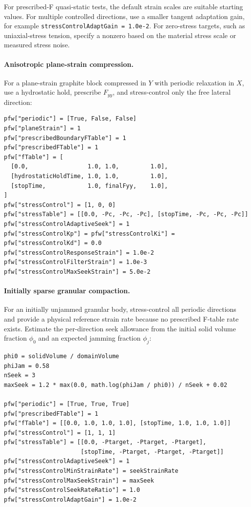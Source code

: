 For prescribed-F quasi-static tests, the default strain scales are suitable
starting values.  For multiple controlled directions, use a smaller tangent
adaptation gain, for example \texttt{stressControlAdaptGain = 1.0e-2}.  For
zero-stress targets, such as uniaxial-stress tension, specify a nonzero
 based on the material stress scale or measured
stress noise.

\paragraph{Anisotropic plane-strain compression.}
For a plane-strain graphite block compressed in $Y$ with periodic relaxation in
$X$, use a hydrostatic hold, prescribe $F_{yy}$, and stress-control only the
free lateral direction:
\begin{lstlisting}[caption={Plane-strain anisotropic compression with X pressure control.}]
pfw["periodic"] = [True, False, False]
pfw["planeStrain"] = 1
pfw["prescribedBoundaryFTable"] = 1
pfw["prescribedFTable"] = 1
pfw["fTable"] = [
  [0.0,                 1.0, 1.0,         1.0],
  [hydrostaticHoldTime, 1.0, 1.0,         1.0],
  [stopTime,            1.0, finalFyy,    1.0],
]
pfw["stressControl"] = [1, 0, 0]
pfw["stressTable"] = [[0.0, -Pc, -Pc, -Pc], [stopTime, -Pc, -Pc, -Pc]]
pfw["stressControlAdaptiveSeek"] = 1
pfw["stressControlKp"] = pfw["stressControlKi"] = pfw["stressControlKd"] = 0.0
pfw["stressControlResponseStrain"] = 1.0e-2
pfw["stressControlFilterStrain"] = 1.0e-3
pfw["stressControlMaxSeekStrain"] = 5.0e-2
\end{lstlisting}

\paragraph{Initially sparse granular compaction.}
For an initially unjammed granular body, stress-control all periodic directions
and provide a physical reference strain rate because no prescribed F-table rate
exists.  Estimate the per-direction seek allowance from the initial solid volume
fraction $\phi_0$ and an expected jamming fraction $\phi_j$:
\begin{lstlisting}[caption={Sparse granular compaction to hydrostatic pressure.}]
phi0 = solidVolume / domainVolume
phiJam = 0.58
nSeek = 3
maxSeek = 1.2 * max(0.0, math.log(phiJam / phi0)) / nSeek + 0.02

pfw["periodic"] = [True, True, True]
pfw["prescribedFTable"] = 1
pfw["fTable"] = [[0.0, 1.0, 1.0, 1.0], [stopTime, 1.0, 1.0, 1.0]]
pfw["stressControl"] = [1, 1, 1]
pfw["stressTable"] = [[0.0, -Ptarget, -Ptarget, -Ptarget],
                      [stopTime, -Ptarget, -Ptarget, -Ptarget]]
pfw["stressControlAdaptiveSeek"] = 1
pfw["stressControlMinStrainRate"] = seekStrainRate
pfw["stressControlMaxSeekStrain"] = maxSeek
pfw["stressControlSeekRateRatio"] = 1.0
pfw["stressControlAdaptGain"] = 1.0e-2
\end{lstlisting}

